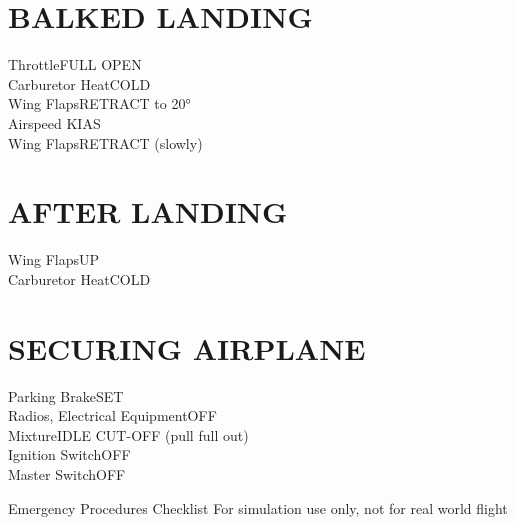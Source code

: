 \documentclass{article}
\begin{document}
\begin{multicols*}{2}
\section*{BALKED LANDING}
Throttle\dotfill FULL OPEN\\
Carburetor Heat\dotfill COLD\\
Wing Flaps\dotfill RETRACT to 20°\\
Airspeed KIAS\\
Wing Flaps\dotfill RETRACT (slowly)
\section*{AFTER LANDING}
Wing Flaps\dotfill UP\\
Carburetor Heat\dotfill COLD\\
\section*{SECURING AIRPLANE}
Parking Brake\dotfill SET\\
Radios, Electrical Equipment\dotfill OFF\\
Mixture\dotfill IDLE CUT-OFF (pull full out)\\
Ignition Switch\dotfill OFF\\
Master Switch\dotfill OFF
\end{multicols*}
\newpage
\centering
{\fontsize{20.74}{70}\selectfont Emergency Procedures Checklist}
\break
\color{Red}
{\fontsize{10}{70}\selectfont For simulation use only, not for real world flight}
\end{document}
